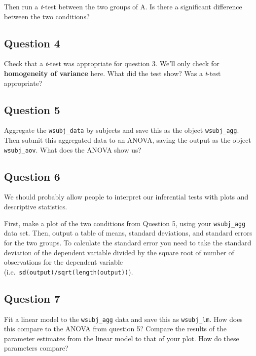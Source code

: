 \documentclass[
]{book}
\begin{document}
Then run a \emph{t}-test between the two groups of A. Is there a significant difference between the two conditions?

\hypertarget{question-4-5}{%
\subsection{Question 4}\label{question-4-5}}

Check that a \emph{t}-test was appropriate for question 3. We'll only check for \textbf{homogeneity of variance} here. What did the test show? Was a \emph{t}-test appropriate?

\hypertarget{question-5-5}{%
\subsection{Question 5}\label{question-5-5}}

Aggregate the \texttt{wsubj\_data} by subjects and save this as the object \texttt{wsubj\_agg}. Then submit this aggregated data to an ANOVA, saving the output as the object \texttt{wsubj\_aov}. What does the ANOVA show us?

\hypertarget{question-6-5}{%
\subsection{Question 6}\label{question-6-5}}

We should probably allow people to interpret our inferential tests with plots and descriptive statistics.

First, make a plot of the two conditions from Question 5, using your \texttt{wsubj\_agg} data set. Then, output a table of means, standard deviations, and standard errors for the two groups. To calculate the standard error you need to take the standard deviation of the dependent variable divided by the square root of number of observations for the dependent variable (i.e.~\texttt{sd(output)/sqrt(length(output))}).

\hypertarget{question-7-5}{%
\subsection{Question 7}\label{question-7-5}}

Fit a linear model to the \texttt{wsubj\_agg} data and save this as \texttt{wsubj\_lm}. How does this compare to the ANOVA from question 5? Compare the results of the parameter estimates from the linear model to that of your plot. How do these parameters compare?
\end{document}
